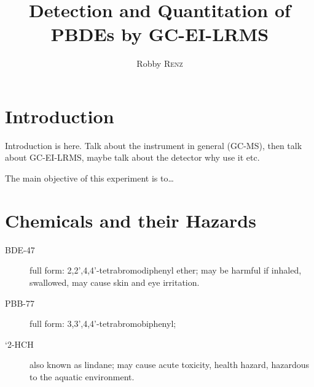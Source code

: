 \documentclass[a4paper, 12pt]{article}
\title{Detection and Quantitation of PBDEs by GC-EI-LRMS}
\author{Robby \textsc{Renz}}
\begin{document}
\maketitle

\section{Introduction}
Introduction is here. Talk about the instrument in general (GC-MS), then talk about GC-EI-LRMS, maybe talk about the detector why use it etc.

The main objective of this experiment is to\dots

\section{Chemicals and their Hazards}

\begin{description}
	\item[BDE-47] full form: 2,2',4,4'-tetrabromodiphenyl ether; may be harmful if inhaled, swallowed, may cause skin and eye irritation.
	\item[PBB-77] full form: 3,3',4,4'-tetrabromobiphenyl; 
	\item[`2-HCH] also known as lindane; may cause acute toxicity, health hazard, hazardous to the aquatic environment.
\end{description}

\printbibliography
\end{document}
